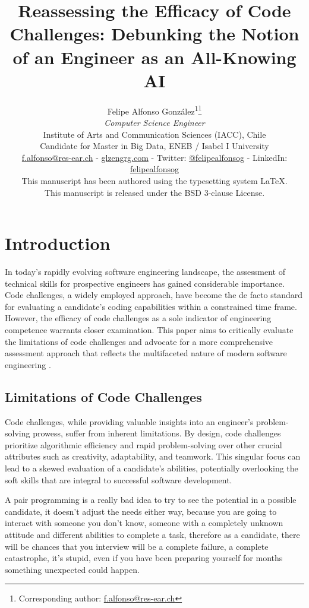 \documentclass[
    a4paper, %
    10pt, %
    unnumberedsections, %
    twoside, %
]{LTJournalArticle}
\title{Reassessing the Efficacy of Code Challenges: Debunking the Notion of an Engineer as an All-Knowing AI}
\author{%
    Felipe Alfonso González\textsuperscript{1}\thanks{Corresponding author: \href{mailto:f.alfonso@res-ear.ch}{f.alfonso@res-ear.ch}}\\
    \textit{ Computer Science Engineer}\\
    \footnotesize Institute of Arts and Communication Sciences (IACC), Chile\\[-6pt]
    \footnotesize Candidate for Master in Big Data, ENEB / Isabel I University\\[-6pt]
    \footnotesize\href{mailto:f.alfonso@res-ear.ch}{f.alfonso@res-ear.ch} - 
    \href{https://glzengrg.com}{glzengrg.com} - 
    Twitter: \href{https://twitter.com/felipealfonsog}{@felipealfonsog} - 
    LinkedIn: \href{https://linkedin.com/in/felipealfonsog}{felipealfonsog}\\
    \scriptsize This manuscript has been authored using the typesetting system \LaTeX{}. \\[-6pt]
    \scriptsize This manuscript is released under the BSD 3-clause License. \\
}
\begin{document}
\maketitle %


\section{Introduction}

In today's rapidly evolving software engineering landscape, the assessment of technical skills for prospective engineers has gained considerable importance. Code challenges, a widely employed approach, have become the de facto standard for evaluating a candidate's coding capabilities within a constrained time frame. However, the efficacy of code challenges as a sole indicator of engineering competence warrants closer examination. This paper aims to critically evaluate the limitations of code challenges and advocate for a more comprehensive assessment approach that reflects the multifaceted nature of modern software engineering \cite{Smith2020,Johnson2019,Brown2021,Garcia2022}.

\subsection{Limitations of Code Challenges}

Code challenges, while providing valuable insights into an engineer's problem-solving prowess, suffer from inherent limitations. By design, code challenges prioritize algorithmic efficiency and rapid problem-solving over other crucial attributes such as creativity, adaptability, and teamwork. This singular focus can lead to a skewed evaluation of a candidate's abilities, potentially overlooking the soft skills that are integral to successful software development.




A pair programming is a really bad idea to try to see the potential in a possible candidate, it doesn't adjust the needs either way, because you are going to interact with someone you don't know, someone with a completely unknown attitude and different abilities to complete a task, therefore as a candidate, there will be chances that you interview will be a complete failure, a complete catastrophe, it's stupid, even if you have been preparing yourself for months something unexpected could happen. 
\end{document}
